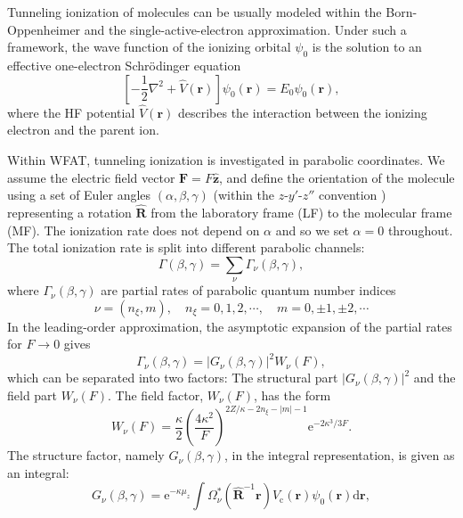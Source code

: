 \documentclass[preprint,12pt]{elsarticle} %
\newcommand{\bn}[1]{\mathbf{#1}}    %
\renewcommand{\rm}[1]{\mathrm{#1}}    %
\newcommand{\dd}{\mathrm{d}}    %
\newcommand{\ee}{\mathrm{e}}    %
\newcommand{\abs}[1]{\lvert #1 \rvert}  %
\begin{document}
Tunneling ionization of molecules can be usually modeled within the Born-Oppenheimer and the single-active-electron approximation. Under such a framework, the wave function of the ionizing orbital $\psi_0$ is the solution to an effective one-electron Schr\"{o}dinger equation
\begin{equation}
    \left[-\frac12\nabla^2 + \hat{V}(\bn{r})\right] \psi_0(\bn{r}) = E_0 \psi_0(\bn{r}),
\end{equation}
where the HF potential $\hat{V}(\bn{r})$ describes the interaction between the ionizing electron and the parent ion.

Within WFAT, tunneling ionization is investigated in parabolic coordinates. We assume the electric field vector $\bn{F}=F\hat{\bn{z}}$, and define the orientation of the molecule using a set of Euler angles $(\alpha,\beta,\gamma)$ (within the $z$-$y'$-$z''$ convention \cite{madsen_structure_2017}) representing a rotation $\hat{\bn{R}}$ from the laboratory frame (LF) to the molecular frame (MF). The ionization rate does not depend on $\alpha$ and so we set $\alpha=0$ throughout. The total ionization rate is split into different parabolic channels:
\begin{equation}
    \Gamma(\beta, \gamma)=\sum_\nu \Gamma_\nu(\beta, \gamma),
\end{equation}
where $\Gamma_\nu(\beta, \gamma)$ are partial rates of parabolic quantum number indices
\begin{equation}
    \nu=(n_\xi,m), \quad n_\xi=0,1,2,\cdots, \quad m=0,\pm 1,\pm 2,\cdots
\end{equation}
In the leading-order approximation, the asymptotic expansion of the partial rates for $F\rightarrow 0$ gives
\begin{equation}
    \Gamma_{\nu}(\beta, \gamma) = \abs{G_\nu(\beta, \gamma)}^2 W_{\nu}(F),
\end{equation}
which can be separated into two factors: The structural part $\abs{G_\nu(\beta, \gamma)}^2$ and the field part $W_{\nu}(F)$.
The field factor, $W_{\nu}(F)$, has the form \cite{ammosov_tunnel_1986,delone_tunneling_1998}
\begin{equation}
    W_{\nu}(F) = \frac{\kappa}{2} \left(\frac{4\kappa^2}{F}\right)^{2Z/\kappa-2n_\xi-\abs{m}-1} \ee^{-{2\kappa^3}/{3F}}.
\end{equation}
The structure factor, namely $G_\nu(\beta, \gamma)$, in the integral representation, is given as an integral:
\begin{equation}
    G_\nu (\beta,\gamma) = \ee^{-\kappa\mu_z} \int \Omega_\nu^* \left(\hat{\bn{R}}^{-1} \bn{r}\right) \hat{V}_{\rm{c}}(\bn{r}) \psi_0(\bn{r}) \dd \bn{r},
    \label{eq:StructFactorExp}
\end{equation}
\end{document}
